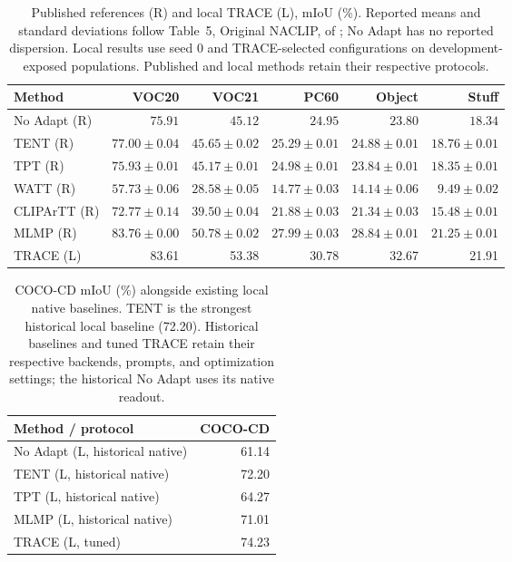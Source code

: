 \begin{table}[t]
\caption{Published references (R) and local TRACE (L), mIoU (\%). Reported means and standard deviations follow Table~5, Original NACLIP, of \citet{noori2025mlmp}; No Adapt has no reported dispersion. Local results use seed 0 and TRACE-selected configurations on development-exposed populations. Published and local methods retain their respective protocols.}
\label{tab:tuned-full-reference}
\centering\small
\begin{tabular}{@{}lrrrrr@{}}
\toprule
Method & VOC20 & VOC21 & PC60 & Object & Stuff \\
\midrule
No Adapt (R) & $75.91$ & $45.12$ & $24.95$ & $23.80$ & $18.34$ \\
TENT (R) & $77.00 \pm 0.04$ & $45.65 \pm 0.02$ & $25.29 \pm 0.01$ & $24.88 \pm 0.01$ & $18.76 \pm 0.01$ \\
TPT (R) & $75.93 \pm 0.01$ & $45.17 \pm 0.01$ & $24.98 \pm 0.01$ & $23.84 \pm 0.01$ & $18.35 \pm 0.01$ \\
WATT (R) & $57.73 \pm 0.06$ & $28.58 \pm 0.05$ & $14.77 \pm 0.03$ & $14.14 \pm 0.06$ & $9.49 \pm 0.02$ \\
CLIPArTT (R) & $72.77 \pm 0.14$ & $39.50 \pm 0.04$ & $21.88 \pm 0.03$ & $21.34 \pm 0.03$ & $15.48 \pm 0.01$ \\
MLMP (R) & $83.76 \pm 0.00$ & $50.78 \pm 0.02$ & $27.99 \pm 0.03$ & $28.84 \pm 0.01$ & $21.25 \pm 0.01$ \\
\midrule
TRACE (L) & 83.61 & 53.38 & 30.78 & 32.67 & 21.91 \\
\bottomrule
\end{tabular}
\end{table}
\begin{table}[t]
\caption{COCO-CD mIoU (\%) alongside existing local native baselines. TENT is the strongest historical local baseline (72.20). Historical baselines and tuned TRACE retain their respective backends, prompts, and optimization settings; the historical No Adapt uses its native readout.}
\label{tab:tuned-full-cd-reference}
\centering\small
\begin{tabular}{@{}lr@{}}
\toprule
Method / protocol & COCO-CD \\
\midrule
No Adapt (L, historical native) & 61.14 \\
TENT (L, historical native) & 72.20 \\
TPT (L, historical native) & 64.27 \\
MLMP (L, historical native) & 71.01 \\
\midrule
TRACE (L, tuned) & 74.23 \\
\bottomrule
\end{tabular}
\end{table}
